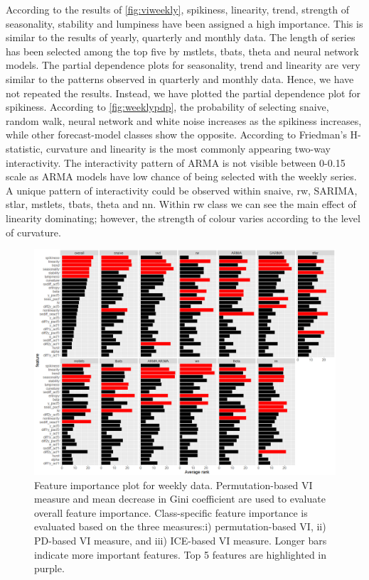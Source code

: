 \documentclass[11pt,a4paper,]{article}
\begin{document}
According to the results of \autoref{fig:viweekly}, spikiness, linearity, trend, strength of seasonality, stability and lumpiness have been assigned a high importance. This is similar to the results of yearly, quarterly and monthly data. The length of series has been selected among the top five by mstlets, tbats, theta and neural network models. The partial dependence plots for seasonality, trend and linearity are very similar to the patterns observed in quarterly and monthly data. Hence, we have not repeated the results. Instead, we have plotted the partial dependence plot for spikiness. According to \autoref{fig:weeklypdp}, the probability of selecting snaive, random walk, neural network and white noise increases as the spikiness increases, while other forecast-model classes show the opposite. According to Friedman's H-statistic, curvature and linearity is the most commonly appearing two-way interactivity. The interactivity pattern of ARMA is not visible between 0-0.15 scale as ARMA models have low chance of being selected with the weekly series. A unique pattern of interactivity could be observed within snaive, rw, SARIMA, stlar, mstlets, tbats, theta and nn. Within rw class we can see the main effect of linearity dominating; however, the strength of colour varies according to the level of curvature.

\begin{figure}[h]

{\centering \includegraphics{figures/viweekly-1} 

}

\caption{Feature importance plot for weekly data. Permutation-based VI measure and mean decrease in Gini coefficient are used to evaluate overall feature importance. Class-specific feature importance is evaluated based on the three measures:i) permutation-based VI, ii) PD-based VI measure, and iii) ICE-based VI measure. Longer bars indicate more important features. Top 5 features are highlighted in purple.}\label{fig:viweekly}
\end{figure}
\end{document}
